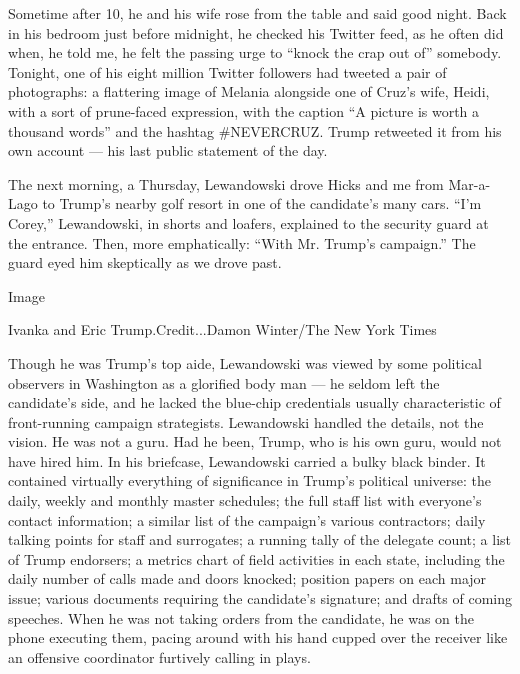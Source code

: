 Sometime after 10, he and his wife rose from the table and said good
night. Back in his bedroom just before midnight, he checked his Twitter
feed, as he often did when, he told me, he felt the passing urge to
``knock the crap out of'' somebody. Tonight, one of his eight million
Twitter followers had tweeted a pair of photographs: a flattering image
of Melania alongside one of Cruz's wife, Heidi, with a sort of
prune-faced expression, with the caption ``A picture is worth a thousand
words'' and the hashtag \#NEVERCRUZ. Trump retweeted it from his own
account --- his last public statement of the day.

The next morning, a Thursday, Lewandowski drove Hicks and me from
Mar-a-Lago to Trump's nearby golf resort in one of the candidate's many
cars. ``I'm Corey,'' Lewandowski, in shorts and loafers, explained to
the security guard at the entrance. Then, more emphatically: ``With Mr.
Trump's campaign.'' The guard eyed him skeptically as we drove past.

Image

Ivanka and Eric Trump.Credit...Damon Winter/The New York Times

Though he was Trump's top aide, Lewandowski was viewed by some political
observers in Washington as a glorified body man --- he seldom left the
candidate's side, and he lacked the blue-chip credentials usually
characteristic of front-running campaign strategists. Lewandowski
handled the details, not the vision. He was not a guru. Had he been,
Trump, who is his own guru, would not have hired him. In his briefcase,
Lewandowski carried a bulky black binder. It contained virtually
everything of significance in Trump's political universe: the daily,
weekly and monthly master schedules; the full staff list with everyone's
contact information; a similar list of the campaign's various
contractors; daily talking points for staff and surrogates; a running
tally of the delegate count; a list of Trump endorsers; a metrics chart
of field activities in each state, including the daily number of calls
made and doors knocked; position papers on each major issue; various
documents requiring the candidate's signature; and drafts of coming
speeches. When he was not taking orders from the candidate, he was on
the phone executing them, pacing around with his hand cupped over the
receiver like an offensive coordinator furtively calling in plays.

